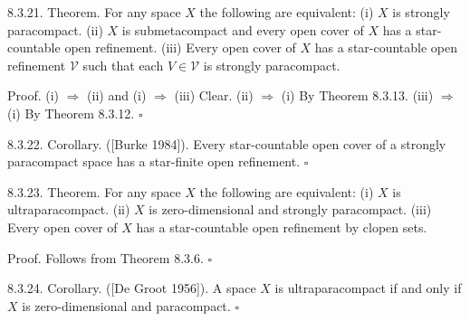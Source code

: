 \documentclass[jiang8iv.tex]{subfiles}
\begin{document}
8.3.21. Theorem. For any space \(X\) the following are equivalent:
(i) \(X\) is strongly paracompact.
(ii) \(X\) is submetacompact and every open cover of \(X\) has a star-countable open refinement.
(iii) Every open cover of \(X\) has a star-countable open refinement \(\mathscr{V}\) such that each \(V\in\mathscr{V}\) is strongly paracompact.

Proof. (i) \(\Rightarrow\) (ii) and (i) \(\Rightarrow\) (iii) Clear.
(ii) \(\Rightarrow\) (i) By Theorem 8.3.13.
(iii) \(\Rightarrow\) (i) By Theorem 8.3.12. \(\square\)

8.3.22. Corollary. ([Burke 1984]). Every star-countable open cover of a strongly paracompact space has a star-finite open refinement. \(\square\)

8.3.23. Theorem. For any space \(X\) the following are equivalent:
(i) \(X\) is ultraparacompact.
(ii) \(X\) is zero-dimensional and strongly paracompact.
(iii) Every open cover of \(X\) has a star-countable open refinement by clopen sets.

Proof. Follows from Theorem 8.3.6. \(\square\)

8.3.24. Corollary. ([De Groot 1956]). A space \(X\) is ultraparacompact if and only if \(X\) is zero-dimensional and paracompact. \(\square\)
\end{document}
